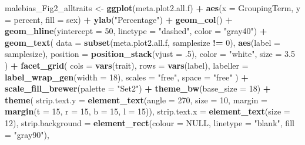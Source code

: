 \documentclass[]{article}
\newenvironment{Shaded}{\begin{snugshade}}{\end{snugshade}}
\newcommand{\DataTypeTok}[1]{\textcolor[rgb]{0.13,0.29,0.53}{#1}}
\newcommand{\DecValTok}[1]{\textcolor[rgb]{0.00,0.00,0.81}{#1}}
\newcommand{\FloatTok}[1]{\textcolor[rgb]{0.00,0.00,0.81}{#1}}
\newcommand{\KeywordTok}[1]{\textcolor[rgb]{0.13,0.29,0.53}{\textbf{#1}}}
\newcommand{\NormalTok}[1]{#1}
\newcommand{\OperatorTok}[1]{\textcolor[rgb]{0.81,0.36,0.00}{\textbf{#1}}}
\newcommand{\OtherTok}[1]{\textcolor[rgb]{0.56,0.35,0.01}{#1}}
\newcommand{\StringTok}[1]{\textcolor[rgb]{0.31,0.60,0.02}{#1}}
\begin{document}
\begin{Shaded}
\begin{Highlighting}[]
{{{{{{{{{{\NormalTok{malebias_Fig2_alltraits <-}
\StringTok{    }\KeywordTok{ggplot}\NormalTok{(meta.plot2.all.f) }\OperatorTok{+}
\StringTok{    }\KeywordTok{aes}\NormalTok{(}\DataTypeTok{x =}\NormalTok{ GroupingTerm, }\DataTypeTok{y =}\NormalTok{ percent, }\DataTypeTok{fill =}\NormalTok{ sex) }\OperatorTok{+}
\StringTok{    }\KeywordTok{ylab}\NormalTok{(}\StringTok{"Percentage"}\NormalTok{) }\OperatorTok{+}
\StringTok{    }\KeywordTok{geom_col}\NormalTok{() }\OperatorTok{+}
\StringTok{    }\KeywordTok{geom_hline}\NormalTok{(}\DataTypeTok{yintercept =} \DecValTok{50}\NormalTok{, }\DataTypeTok{linetype =} \StringTok{"dashed"}\NormalTok{, }\DataTypeTok{color =} \StringTok{"gray40"}\NormalTok{) }\OperatorTok{+}
\StringTok{    }\KeywordTok{geom_text}\NormalTok{(}
      \DataTypeTok{data =} \KeywordTok{subset}\NormalTok{(meta.plot2.all.f, samplesize }\OperatorTok{!=}\StringTok{ }\DecValTok{0}\NormalTok{), }\KeywordTok{aes}\NormalTok{(}\DataTypeTok{label =}\NormalTok{ samplesize), }\DataTypeTok{position =} \KeywordTok{position_stack}\NormalTok{(}\DataTypeTok{vjust =} \FloatTok{.5}\NormalTok{),}
      \DataTypeTok{color =} \StringTok{"white"}\NormalTok{, }\DataTypeTok{size =} \FloatTok{3.5}
\NormalTok{    ) }\OperatorTok{+}
\StringTok{    }\KeywordTok{facet_grid}\NormalTok{(}
      \DataTypeTok{cols =} \KeywordTok{vars}\NormalTok{(trait), }\DataTypeTok{rows =} \KeywordTok{vars}\NormalTok{(label), }\DataTypeTok{labeller =} \KeywordTok{label_wrap_gen}\NormalTok{(}\DataTypeTok{width =} \DecValTok{18}\NormalTok{),}
      \DataTypeTok{scales =} \StringTok{"free"}\NormalTok{, }\DataTypeTok{space =} \StringTok{"free"}
\NormalTok{    ) }\OperatorTok{+}\StringTok{  }
\StringTok{    }\KeywordTok{scale_fill_brewer}\NormalTok{(}\DataTypeTok{palette =} \StringTok{"Set2"}\NormalTok{) }\OperatorTok{+}
\StringTok{    }\KeywordTok{theme_bw}\NormalTok{(}\DataTypeTok{base_size =} \DecValTok{18}\NormalTok{) }\OperatorTok{+}
\StringTok{    }\KeywordTok{theme}\NormalTok{(}
      \DataTypeTok{strip.text.y =} \KeywordTok{element_text}\NormalTok{(}\DataTypeTok{angle =} \DecValTok{270}\NormalTok{, }\DataTypeTok{size =} \DecValTok{10}\NormalTok{, }\DataTypeTok{margin =} \KeywordTok{margin}\NormalTok{(}\DataTypeTok{t =} \DecValTok{15}\NormalTok{, }\DataTypeTok{r =} \DecValTok{15}\NormalTok{, }\DataTypeTok{b =} \DecValTok{15}\NormalTok{, }\DataTypeTok{l =} \DecValTok{15}\NormalTok{)),}
      \DataTypeTok{strip.text.x =} \KeywordTok{element_text}\NormalTok{(}\DataTypeTok{size =} \DecValTok{12}\NormalTok{),}
      \DataTypeTok{strip.background =} \KeywordTok{element_rect}\NormalTok{(}\DataTypeTok{colour =} \OtherTok{NULL}\NormalTok{, }\DataTypeTok{linetype =} \StringTok{"blank"}\NormalTok{, }\DataTypeTok{fill =} \StringTok{"gray90"}\NormalTok{),}
}}}}}}}}}}
\end{Highlighting}
\end{Shaded}
\end{document}
